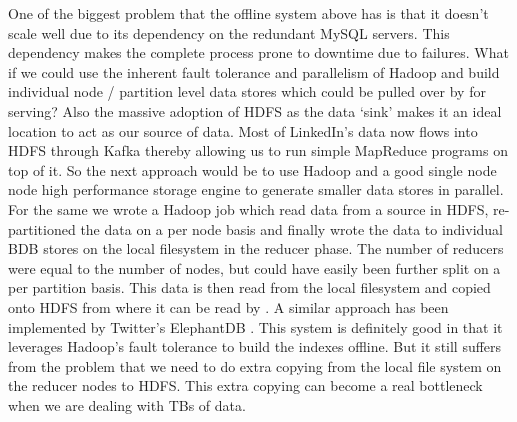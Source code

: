 \documentclass[10pt,twocolumn,preprint,nonatbib,numbers]{sigplanconf}
\begin{document}
One of the biggest problem that the offline system above has is that it doesn't scale well due to its dependency on the redundant MySQL servers. This dependency makes the complete process prone to downtime due to failures. What if we could use the inherent fault tolerance and parallelism of Hadoop and build individual node / partition level data stores which could be pulled over by \projectname{} for serving? Also the massive adoption of HDFS as the data `sink' makes it an ideal location to act as our source of data. Most of LinkedIn's data now flows into HDFS through Kafka thereby allowing us to run simple MapReduce programs on top of it. So the next approach would be to use Hadoop and a good single node node high performance storage engine to generate smaller data stores in parallel. For the same we wrote a Hadoop job which read data from a source in HDFS, re-partitioned the data on a per node basis and finally wrote the data to individual BDB stores on the local filesystem in the reducer phase. The number of reducers were equal to the number of nodes, but could have easily been further split on a per partition basis. This data is then read from the local filesystem and copied onto HDFS from where it can be read by \projectname{}. A similar approach has been implemented by Twitter's ElephantDB \cite{elephantdb}. This system is definitely good in that it leverages Hadoop's fault tolerance to build the indexes offline. But it still suffers from the problem that we need to do extra copying from the local file system on the reducer nodes to HDFS. This extra copying can become a real bottleneck when we are dealing with TBs of data. 
\end{document}
